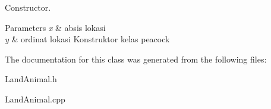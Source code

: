 Constructor. 


\begin{DoxyParams}{Parameters}
{\em x} & absis lokasi \\
\hline
{\em y} & ordinat lokasi Konstruktor kelas peacock \\
\hline
\end{DoxyParams}


The documentation for this class was generated from the following files\+:\begin{DoxyCompactItemize}
\item 
Land\+Animal.\+h\item 
Land\+Animal.\+cpp\end{DoxyCompactItemize}
